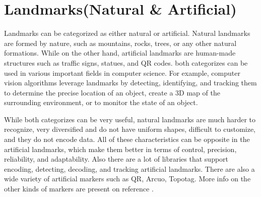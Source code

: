 \section{Landmarks(Natural \& Artificial)}

Landmarks can be categorized as either natural or artificial. Natural landmarks
are formed by nature, such as mountains, rocks, trees, or any other natural
formations. While on the other hand, artificial landmarks are human-made
structures such as traffic signs, statues, and QR codes. both categorizes can be used in various important fields in computer science. For example, computer vision algorithms leverage landmarks by detecting, identifying, and tracking them to determine the precise location of an object, create a 3D map of the surrounding environment, or to monitor the state of an object.

While both categorizes can be very useful, natural landmarks are much harder to recognize, very diversified and do not have uniform shapes, difficult to customize, and they do not encode data. All of these characteristics can be opposite in the artificial landmarks, which make them better in terms of control, precision, reliability, and adaptability. Also there are a lot of libraries that support encoding, detecting, decoding, and tracking artificial landmarks. There are also a wide variety of artificial markers such as QR, Arcuo, Topotag. 
More info on the other kinds of markers are present on reference \cite{Fiducial2021}.

	
